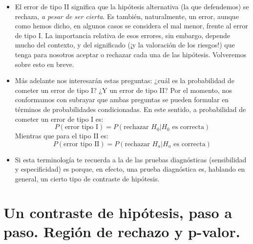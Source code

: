 \begin{itemize}
        \item El {\sf error de tipo II} significa que la hipótesis alternativa (la que defendemos) se rechaza, {\em a pesar de ser cierta}. Es también, naturalmente, un error, aunque como hemos dicho, en algunos casos se considera el mal menor, frente al error de tipo I. La importancia relativa de esos errores, sin embargo, depende mucho del contexto, y del significado (¡y la valoración de los riesgos!) que tenga para nosotros aceptar o rechazar cada una  de las hipótesis. Volveremos sobre esto en breve.

        \item Más adelante nos interesarán estas preguntas: ¿cuál es la probabilidad de cometer un error de tipo I? ¿Y un error de tipo II? Por el momento, nos conformamos con subrayar que ambas preguntas se pueden formular en términos de probabilidades condicionadas. En este sentido, a probabilidad de cometer un error de tipo I es:
            \[P(\mbox{error tipo I})=P(\mbox{rechazar $H_0$}|\mbox{$H_0$ es correcta})\]
            Mientras que para el tipo II es:
            \[P(\mbox{error tipo II})=P(\mbox{rechazar $H_a$}|\mbox{$H_a$ es correcta})\]

        \item Si esta terminología te recuerda a la de las pruebas diagnósticas (sensibilidad y especificidad) es porque, en efecto, una prueba diagnóstica es, hablando en general, un cierto tipo de contraste de hipótesis.

    \end{itemize}

    \section{Un contraste de hipótesis, paso a paso. Región de rechazo y p-valor.}

